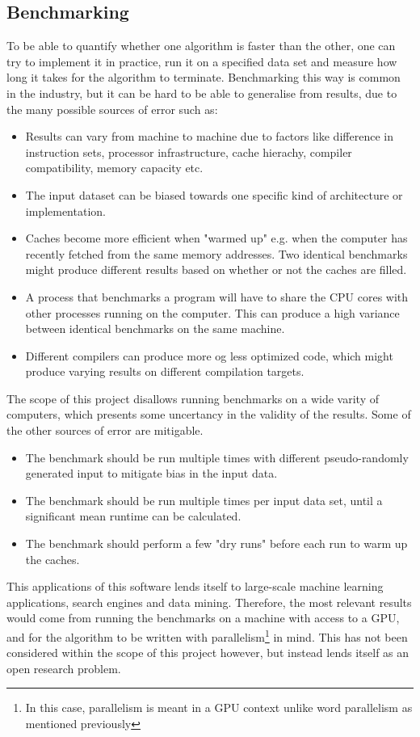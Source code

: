 \subsection{Benchmarking}
To be able to quantify whether one algorithm is faster than the other, one can try to implement it in practice, run it on a specified data set and measure how long it takes for the algorithm to terminate. Benchmarking this way is common in the industry, but it can be hard to be able to generalise from results, due to the many possible sources of error such as:
\begin{itemize}
    \item Results can vary from machine to machine due to factors like difference in instruction sets, processor infrastructure, cache hierachy, compiler compatibility, memory capacity etc.
    \item The input dataset can be biased towards one specific kind of architecture or implementation.
    \item Caches become more efficient when "warmed up" e.g. when the computer has recently fetched from the same memory addresses. Two identical benchmarks might produce different results based on whether or not the caches are filled.
    \item A process that benchmarks a program will have to share the CPU cores with other processes running on the computer. This can produce a high variance between identical benchmarks on the same machine.
    \item Different compilers can produce more og less optimized code, which might produce varying results on different compilation targets.
\end{itemize}
The scope of this project disallows running benchmarks on a wide varity of computers, which presents some uncertancy in the validity of the results. Some of the other sources of error are mitigable.
\begin{itemize}
    \item The benchmark should be run multiple times with different pseudo-randomly generated input to mitigate bias in the input data.
    \item The benchmark should be run multiple times per input data set, until a significant mean runtime can be calculated.
    \item The benchmark should perform a few "dry runs" before each run to warm up the caches.
\end{itemize}
This applications of this software lends itself to large-scale machine learning applications, search engines and data mining. Therefore, the most relevant results would come from running the benchmarks on a machine with access to a GPU, and for the algorithm to be written with parallelism\footnote{In this case, parallelism is meant in a GPU context unlike word parallelism as mentioned previously} in mind. This has not been considered within the scope of this project however, but instead lends itself as an open research problem.
